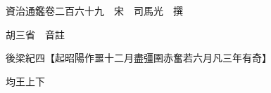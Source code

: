 










 


 
 


 

  
  
  
  
  





  
  
  
  
  
 
  

  

  
  
  



  

 
 

  
   




  

  
  


  　　資治通鑑卷二百六十九　宋　司馬光　撰

　　胡三省　音註

　　後梁紀四【起昭陽作噩十二月盡彊圉赤奮若六月凡三年有奇】

　　均王上下

